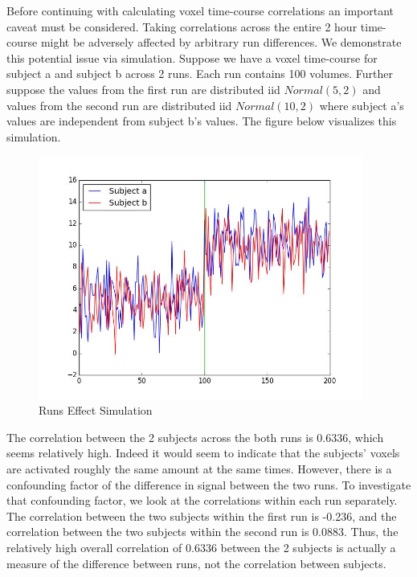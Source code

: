\documentclass[11pt]{article}
\begin{document}
Before continuing with calculating voxel time-course correlations an important caveat must be considered. Taking correlations across the entire 2 hour time-course might be adversely affected by arbitrary run differences. We demonstrate this potential issue via simulation. Suppose we have a voxel time-course for subject a and subject b across 2 runs. Each run contains 100 volumes. Further suppose the values from the first run are distributed iid $Normal(5, 2)$ and values from the second run are distributed iid $Normal(10, 2)$ where subject a's values are independent from subject b's values. The figure below visualizes this simulation.

\begin{figure}[H]                                                               
\caption{Runs Effect Simulation}                                                   
\centering                                                                      
\includegraphics[height=8cm]{simulation.jpg}                            
\end{figure}  

The correlation between the 2 subjects across the both runs is 0.6336, which
seems relatively high. Indeed it would seem to indicate that the subjects' voxels are activated 
roughly the same amount at the same times. However, there is a confounding
factor of the difference in signal between the two runs.  To investigate that
confounding factor, we look at the correlations within each run separately.  
The correlation between the two subjects within the first run is -0.236, and 
the correlation between the two subjects within the second run is 0.0883.  
Thus, the relatively high overall correlation of 0.6336 between the 2 subjects 
is actually a measure of the difference between runs, not the correlation 
between subjects.
\end{document}

